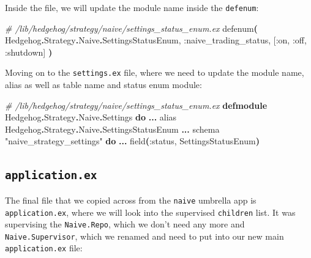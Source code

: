 \documentclass[
  oneside]{book}
\newenvironment{Shaded}{\begin{snugshade}}{\end{snugshade}}
\newcommand{\CommentTok}[1]{\textcolor[rgb]{0.56,0.35,0.01}{\textit{#1}}}
\newcommand{\ConstantTok}[1]{\textcolor[rgb]{0.56,0.35,0.01}{#1}}
\newcommand{\FunctionTok}[1]{\textcolor[rgb]{0.13,0.29,0.53}{\textbf{#1}}}
\newcommand{\ImportTok}[1]{#1}
\newcommand{\KeywordTok}[1]{\textcolor[rgb]{0.13,0.29,0.53}{\textbf{#1}}}
\newcommand{\NormalTok}[1]{#1}
\newcommand{\OperatorTok}[1]{\textcolor[rgb]{0.81,0.36,0.00}{\textbf{#1}}}
\newcommand{\OtherTok}[1]{\textcolor[rgb]{0.56,0.35,0.01}{#1}}
\newcommand{\StringTok}[1]{\textcolor[rgb]{0.31,0.60,0.02}{#1}}
\newcommand{\VariableTok}[1]{\textcolor[rgb]{0.00,0.00,0.00}{#1}}
\begin{document}
Inside the file, we will update the module name inside the \texttt{defenum}:

\begin{Shaded}
\begin{Highlighting}[]
\CommentTok{\# /lib/hedgehog/strategy/naive/settings\_status\_enum.ex}
\NormalTok{defenum}\FunctionTok{(}
  \ConstantTok{Hedgehog}\OperatorTok{.}\ConstantTok{Strategy}\OperatorTok{.}\ConstantTok{Naive}\OperatorTok{.}\ConstantTok{SettingsStatusEnum}\NormalTok{,}
  \VariableTok{:naive\_trading\_status}\NormalTok{,}
  \OtherTok{[}\VariableTok{:on}\NormalTok{, }\VariableTok{:off}\NormalTok{, }\VariableTok{:shutdown}\OtherTok{]}
\FunctionTok{)}
\end{Highlighting}
\end{Shaded}

Moving on to the \texttt{settings.ex} file, where we need to update the module name, alias as well as table name and status enum module:

\begin{Shaded}
\begin{Highlighting}[]
\CommentTok{\# /lib/hedgehog/strategy/naive/settings\_status\_enum.ex}
\KeywordTok{defmodule} \ConstantTok{Hedgehog}\OperatorTok{.}\ConstantTok{Strategy}\OperatorTok{.}\ConstantTok{Naive}\OperatorTok{.}\ConstantTok{Settings} \KeywordTok{do}
  \OperatorTok{...}
  \ImportTok{alias} \ConstantTok{Hedgehog}\OperatorTok{.}\ConstantTok{Strategy}\OperatorTok{.}\ConstantTok{Naive}\OperatorTok{.}\ConstantTok{SettingsStatusEnum}
  \OperatorTok{...}
\NormalTok{  schema }\StringTok{"naive\_strategy\_settings"} \KeywordTok{do}
    \OperatorTok{...}
\NormalTok{    field}\FunctionTok{(}\VariableTok{:status}\NormalTok{, }\ConstantTok{SettingsStatusEnum}\FunctionTok{)}
\end{Highlighting}
\end{Shaded}

\subsection{\texorpdfstring{\texttt{application.ex}}{application.ex}}\label{application.ex}

The final file that we copied across from the \texttt{naive} umbrella app is \texttt{application.ex}, where we will look into the supervised \texttt{children} list. It was supervising the \texttt{Naive.Repo}, which we don't need any more and \texttt{Naive.Supervisor}, which we renamed and need to put into our new main \texttt{application.ex} file:
\end{document}
